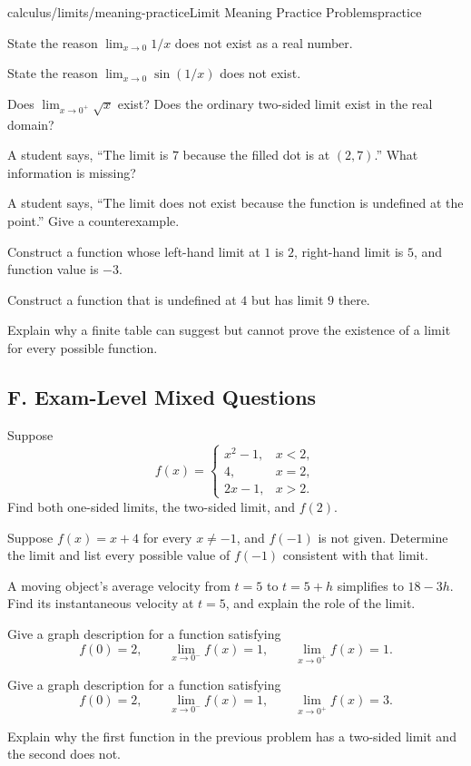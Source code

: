 \documentclass[11pt,openany]{book}
\theoremstyle{bgplain}
\begin{document}
\begin{webpage}{calculus/limits/meaning-practice}{Limit Meaning Practice Problems}{practice}
\begin{bgexercises}[label=\textbf{1.\arabic*},resume]
  \item State the reason \(\lim_{x\to0}1/x\) does not exist as a real number.
  \item State the reason \(\lim_{x\to0}\sin(1/x)\) does not exist.
  \item Does \(\lim_{x\to0^+}\sqrt{x}\) exist? Does the ordinary two-sided limit exist in the real domain?
  \item A student says, ``The limit is \(7\) because the filled dot is at \((2,7)\).'' What information is missing?
  \item A student says, ``The limit does not exist because the function is undefined at the point.'' Give a counterexample.
  \item Construct a function whose left-hand limit at \(1\) is \(2\), right-hand limit is \(5\), and function value is \(-3\).
  \item Construct a function that is undefined at \(4\) but has limit \(9\) there.
  \item Explain why a finite table can suggest but cannot prove the existence of a limit for every possible function.
\end{bgexercises}

\subsection*{F. Exam-Level Mixed Questions}

\begin{bgexercises}[label=\textbf{1.\arabic*},resume]
  \item Suppose
  \[
    f(x)=\begin{cases}
      x^2-1,&x<2,\\
      4,&x=2,\\
      2x-1,&x>2.
    \end{cases}
  \]
  Find both one-sided limits, the two-sided limit, and \(f(2)\).
  \item Suppose \(f(x)=x+4\) for every \(x\ne-1\), and \(f(-1)\) is not given. Determine the limit and list every possible value of \(f(-1)\) consistent with that limit.
  \item A moving object's average velocity from \(t=5\) to \(t=5+h\) simplifies to \(18-3h\). Find its instantaneous velocity at \(t=5\), and explain the role of the limit.
  \item Give a graph description for a function satisfying
  \[
    f(0)=2,\qquad
    \lim_{x\to0^-}f(x)=1,\qquad
    \lim_{x\to0^+}f(x)=1.
  \]
  \item Give a graph description for a function satisfying
  \[
    f(0)=2,\qquad
    \lim_{x\to0^-}f(x)=1,\qquad
    \lim_{x\to0^+}f(x)=3.
  \]
  \item Explain why the first function in the previous problem has a two-sided limit and the second does not.
\end{bgexercises}


\end{webpage}
\end{document}
